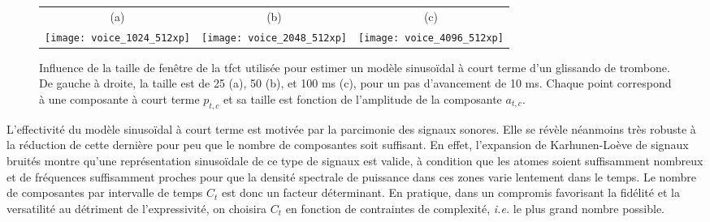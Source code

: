 \begin{figure*}[t]
  \footnotesize
  \begin{tabular}{ccc}
    (a) & (b) & (c)  \\
  \texttt{[image: voice\_1024\_512xp]} &
  \texttt{[image: voice\_2048\_512xp]} &
  \texttt{[image: voice\_4096\_512xp]} \\
\end{tabular}
  \caption{Influence de la taille de fenêtre de la tfct utilisée pour estimer un modèle sinusoïdal à court terme d'un glissando de trombone. De gauche à droite, la taille est de 25 (a), 50 (b), et 100 ms (c), pour un pas d'avancement de 10 ms. Chaque point correspond  à une composante à court terme $p_{t, c}$ et sa taille est fonction de l'amplitude de la composante $a_{t, c}$.}
  \label{fig:ct}
\end{figure*}

L'effectivité du modèle sinusoïdal à court terme est motivée par la parcimonie des signaux sonores. Elle se révèle néanmoins très robuste à la réduction de cette dernière pour peu que le nombre de composantes soit suffisant. En effet, l'expansion de Karhunen-Lo\`eve de signaux bruités montre qu'une représentation sinusoïdale de ce type de signaux est valide, à condition que les atomes soient suffisamment nombreux et de fréquences suffisamment proches pour que la densité spectrale de puissance dans ces zones varie lentement dans le temps. Le nombre de composantes par intervalle de temps $C_t$ est donc un facteur déterminant. En pratique, dans un compromis favorisant la fidélité et la versatilité au détriment de l'expressivité, on choisira $C_t$ en fonction de contraintes de complexité, \textit{i.e.} le plus grand nombre possible.




